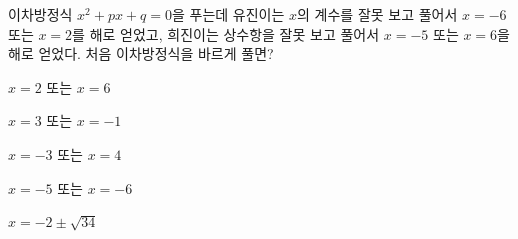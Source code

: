 이차방정식 $x^2+px+q=0$을 푸는데 유진이는 $x$의 계수를 잘못 보고 풀어서 $x=-6$ 또는 $x=2$를 해로 얻었고, 희진이는 상수항을 잘못 보고 풀어서 $x=-5$ 또는 $x=6$을 해로 얻었다. 처음 이차방정식을 바르게 풀면? 
\begin{choicesii}{\rule[-3ex]{0pt}{8ex}$x=2$ 또는 $x=6$}{\rule[-3ex]{0pt}{8ex}$x=3$ 또는 $x=-1$}{\rule[-3ex]{0pt}{8ex}$x=-3$ 또는 $x=4$}{\rule[-3ex]{0pt}{8ex}$x=-5$ 또는 $x=-6$}{\rule[-3ex]{0pt}{8ex}$x=-2\pm\sqrt{34}$}\end{choicesii}
